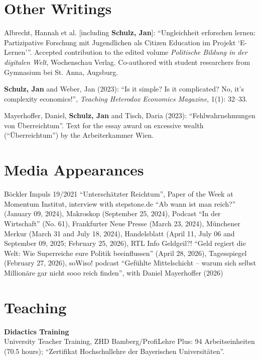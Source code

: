 \documentclass[margin]{res}
\begin{document}
\begin{resume}
	
	
	\section{Other Writings}
	Albrecht, Hannah et al. [including \textbf{Schulz, Jan}]: 
	``Ungleichheit erforschen \mbox{lernen}: Partizipative Forschung mit Jugendlichen als Citizen Education im \mbox{Projekt} \textquoteleft{}\mbox{E-Lernen}\textquoteright{}''.
	Accepted contribution to the edited volume \textit{Politische Bildung in der digitalen Welt}, Wochenschau Verlag.
	Co-authored with student researchers from Gymnasium bei St. Anna, Augsburg.
	
	\textbf{Schulz, Jan} and Weber, Jan (2023): ``Is it simple? Is it complicated? No, it's complexity economics!'', \emph{Teaching Heterodox Economics Magazine}, 1(1): 32--33.
	
	Mayerhoffer, Daniel, \textbf{Schulz, Jan} and Tisch, Daria (2023): ``Fehlwahrnehmungen von \"Uberreichtum''. Text for the essay award on excessive wealth (``\"Uberreichtum'') by the Arbeiterkammer Wien.
	\newpage
	\section{Media Appearances} 
	B\"ockler Impuls 19/2021 ``Untersch\"atzter Reichtum'', Paper of the Week at Momentum Institut, interview with stepstone.de ``Ab wann ist man reich?'' (January 09, 2024), Makroskop (September 25, 2024), Podcast ``In der Wirtschaft'' (No. 61), Frankfurter Neue Presse (March 23, 2024), M\"unchener Merkur (March 31 and July 18, 2024), Handelsblatt (April 11, July 06 and September 09, 2025; February 25, 2026), RTL Info Geldgeil?! ``Geld regiert die Welt: Wie Superreiche eure Politik beeinflussen'' (April 28, 2026), Tagesspiegel (February 27, 2026), soWiso! podcast ``Gef\"uhlte Mittelschicht -- warum sich selbst Million\"are gar nicht sooo reich finden'', with Daniel Mayerhoffer (2026)

	\section{Teaching} \textbf{Didactics Training}\\
	University Teacher Training, ZHD Bamberg/ProfiLehre Plus: 94 Arbeitseinheiten (70.5 hours); ``Zertifikat Hochschullehre der Bayerischen Universit\"aten''.
	

\end{resume}
\end{document}

